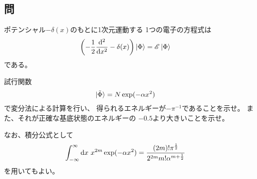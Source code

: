 \subsection{問}
ポテンシャル$-\delta(x)$のもとに1次元運動する
1つの電子の\Schrodinger 方程式は
\begin{align}
	\left(
		-
		\frac{1}{2}\frac{{\rm d}^2}{{\rm d} x^2}
		-
		\delta(x)
	\right)\ket{\Phi}
&=
	\mathscr{E}\ket{\Phi}
\end{align}
である。

試行関数
\begin{align}
	\ket{\tilde{\Phi}}
&=
	N \exp(-\alpha x^2)
\end{align}
で変分法による計算を行い、
得られるエネルギーが$-\pi^{-1}$であることを示せ。
また、それが正確な基底状態のエネルギーの
$-0.5$より大きいことを示せ。

なお、積分公式として
\begin{align}
	\int_{-\infty}^{\infty} {\rm d} x\
		x^{2m} \exp(-\alpha x^2)
&=
	\frac{
		(2m)! \pi^{\frac{1}{2}}
	}{
		2^{2m} m! \alpha^{m+\frac{1}{2}}
	}
\end{align}
を用いてもよい。

